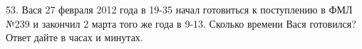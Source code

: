53. Вася 27 февраля 2012 года в 19-35 начал готовиться к поступлению в ФМЛ №239 и закончил 2 марта того же года в 9-13. Сколько времени Вася готовился? Ответ дайте в часах и минутах.\\
